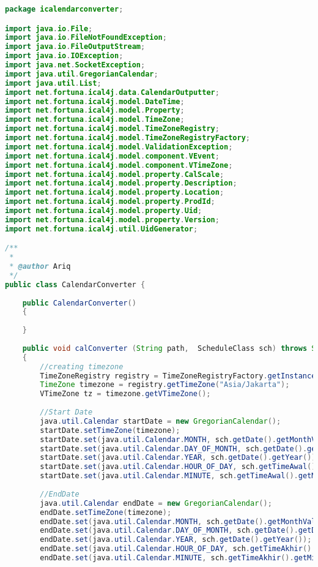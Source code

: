 \begin{lstlisting}[language=Java,basicstyle=\tiny,caption=CalendarConverter.java,label=lst:CalendarConverter]
package icalendarconverter;

import java.io.File;
import java.io.FileNotFoundException;
import java.io.FileOutputStream;
import java.io.IOException;
import java.net.SocketException;
import java.util.GregorianCalendar;
import java.util.List;
import net.fortuna.ical4j.data.CalendarOutputter;
import net.fortuna.ical4j.model.DateTime;
import net.fortuna.ical4j.model.Property;
import net.fortuna.ical4j.model.TimeZone;
import net.fortuna.ical4j.model.TimeZoneRegistry;
import net.fortuna.ical4j.model.TimeZoneRegistryFactory;
import net.fortuna.ical4j.model.ValidationException;
import net.fortuna.ical4j.model.component.VEvent;
import net.fortuna.ical4j.model.component.VTimeZone;
import net.fortuna.ical4j.model.property.CalScale;
import net.fortuna.ical4j.model.property.Description;
import net.fortuna.ical4j.model.property.Location;
import net.fortuna.ical4j.model.property.ProdId;
import net.fortuna.ical4j.model.property.Uid;
import net.fortuna.ical4j.model.property.Version;
import net.fortuna.ical4j.util.UidGenerator;

/**
 *
 * @author Ariq
 */
public class CalendarConverter {
    
    public CalendarConverter()
    {
        
    }
    
    public void calConverter (String path,  ScheduleClass sch) throws SocketException, FileNotFoundException, IOException, ValidationException
    {
        //creating timezone
        TimeZoneRegistry registry = TimeZoneRegistryFactory.getInstance().createRegistry();
        TimeZone timezone = registry.getTimeZone("Asia/Jakarta");
        VTimeZone tz = timezone.getVTimeZone();
        
        //Start Date
        java.util.Calendar startDate = new GregorianCalendar();
        startDate.setTimeZone(timezone);
        startDate.set(java.util.Calendar.MONTH, sch.getDate().getMonthValue()-1);
        startDate.set(java.util.Calendar.DAY_OF_MONTH, sch.getDate().getDayOfMonth());
        startDate.set(java.util.Calendar.YEAR, sch.getDate().getYear());
        startDate.set(java.util.Calendar.HOUR_OF_DAY, sch.getTimeAwal().getHour());
        startDate.set(java.util.Calendar.MINUTE, sch.getTimeAwal().getMinute());
        
        //EndDate
        java.util.Calendar endDate = new GregorianCalendar();
        endDate.setTimeZone(timezone);
        endDate.set(java.util.Calendar.MONTH, sch.getDate().getMonthValue()-1);
        endDate.set(java.util.Calendar.DAY_OF_MONTH, sch.getDate().getDayOfMonth());
        endDate.set(java.util.Calendar.YEAR, sch.getDate().getYear());
        endDate.set(java.util.Calendar.HOUR_OF_DAY, sch.getTimeAkhir().getHour());
        endDate.set(java.util.Calendar.MINUTE, sch.getTimeAkhir().getMinute());
       

\end{lstlisting}
